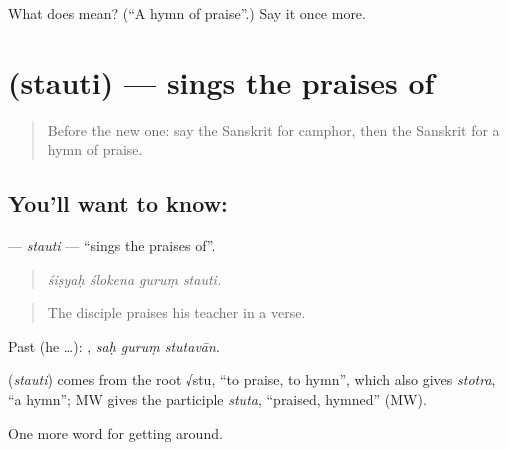 \begin{tcolorbox}[breakable,colback=teal!4,colframe=teal!35!black,title={Before you move on}]
What does  mean? (\textquotedblleft{}A hymn of praise\textquotedblright{}.) Say it once more.
\end{tcolorbox}
\section[\texorpdfstring{\sk{स्तौति} (stauti)}{स्तौति (stauti)}]{ (stauti) — sings the praises of}

\label{lesson:SA-C397-stauti}



\begin{quote}
Before the new one: say the Sanskrit for camphor, then the Sanskrit for a hymn of praise.
\end{quote}

\subsection*{You'll want to know: }
\textbf{} — \emph{stauti} — \textquotedblleft{}sings the praises of\textquotedblright{}.

\begin{quote}
   
\end{quote}

\begin{quote}
\emph{śiṣyaḥ ślokena guruṃ stauti.}
\end{quote}

\begin{quote}
The disciple praises his teacher in a verse.
\end{quote}

Past (he …):   , \emph{saḥ guruṃ stutavān}.

\begin{cousinweb}
\textbf{} (\emph{stauti}) comes from the root √stu, \textquotedblleft{}to praise, to hymn\textquotedblright{}, which also gives \emph{stotra}, \textquotedblleft{}a hymn\textquotedblright{}; MW gives the participle \emph{stuta}, \textquotedblleft{}praised, hymned\textquotedblright{} (MW).
\end{cousinweb}

\begin{grammarlens}[title={What you've built}]
One more word for getting around.
\end{grammarlens}

